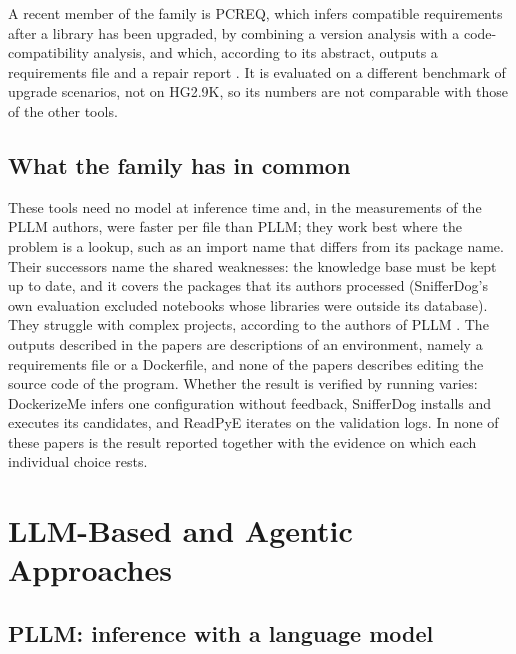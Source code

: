 A recent member of the family is PCREQ, which infers compatible requirements after a library has been upgraded, by combining a version analysis with a code-compatibility analysis, and which, according to its abstract, outputs a requirements file and a repair report \cite{lei2025pcreq}. It is evaluated on a different benchmark of upgrade scenarios, not on HG2.9K, so its numbers are not comparable with those of the other tools.%

\subsection{What the family has in common}

These tools need no model at inference time and, in the measurements of the PLLM authors, were faster per file than PLLM; they work best where the problem is a lookup, such as an import name that differs from its package name. Their successors name the shared weaknesses: the knowledge base must be kept up to date, and it covers the packages that its authors processed (SnifferDog's own evaluation excluded notebooks whose libraries were outside its database). They struggle with complex projects, according to the authors of PLLM \cite{bartlett2025lastdependency}. The outputs described in the papers are descriptions of an environment, namely a requirements file or a Dockerfile, and none of the papers describes editing the source code of the program. Whether the result is verified by running varies: DockerizeMe infers one configuration without feedback, SnifferDog installs and executes its candidates, and ReadPyE iterates on the validation logs. In none of these papers is the result reported together with the evidence on which each individual choice rests.%

\section{LLM-Based and Agentic Approaches}\label{sec:sota-llm}

\subsection{PLLM: inference with a language model}

